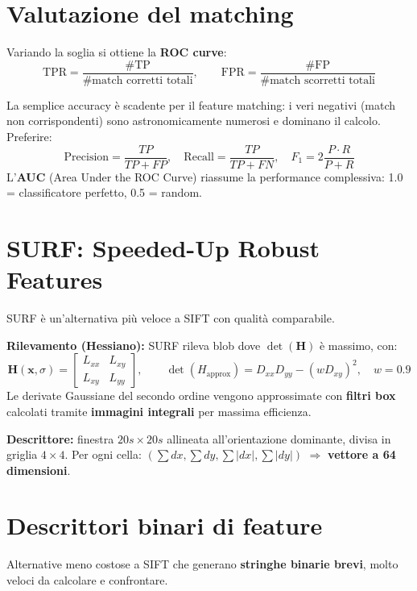 \documentclass[12pt, a4paper]{report}
\begin{document}
\section{Valutazione del matching}

Variando la soglia si ottiene la \textbf{ROC curve}:
\[
  \mathrm{TPR}=\frac{\#\mathrm{TP}}{\#\text{match corretti totali}}, \qquad
  \mathrm{FPR}=\frac{\#\mathrm{FP}}{\#\text{match scorretti totali}}
\]

\begin{notebox}
La semplice accuracy è scadente per il feature matching: i veri negativi
(match non corrispondenti) sono astronomicamente numerosi e dominano il calcolo.
Preferire:
\[
  \mathrm{Precision}=\frac{TP}{TP+FP},\quad
  \mathrm{Recall}=\frac{TP}{TP+FN},\quad
  F_1=2\frac{P\cdot R}{P+R}
\]
L'\textbf{AUC} (Area Under the ROC Curve) riassume la performance complessiva:
1.0 = classificatore perfetto, 0.5 = random.
\end{notebox}

\section{SURF: Speeded-Up Robust Features}

SURF è un'alternativa più veloce a SIFT con qualità comparabile.

\textbf{Rilevamento (Hessiano):} SURF rileva blob dove $\det(\mathbf{H})$ è
massimo, con:
\[
  \mathbf{H}(\mathbf{x},\sigma)=
  \begin{bmatrix}L_{xx}&L_{xy}\\L_{xy}&L_{yy}\end{bmatrix}, \qquad
  \det(H_{\mathrm{approx}})=D_{xx}D_{yy}-(wD_{xy})^2, \quad w=0.9
\]
Le derivate Gaussiane del secondo ordine vengono approssimate con \textbf{filtri
box} calcolati tramite \textbf{immagini integrali} per massima efficienza.

\textbf{Descrittore:} finestra $20s\times20s$ allineata all'orientazione dominante,
divisa in griglia $4\times4$. Per ogni cella: $(\sum dx, \sum dy, \sum|dx|,
\sum|dy|)$ $\Rightarrow$ \textbf{vettore a 64 dimensioni}.

\section{Descrittori binari di feature}

Alternative meno costose a SIFT che generano \textbf{stringhe binarie brevi},
molto veloci da calcolare e confrontare.
\end{document}
